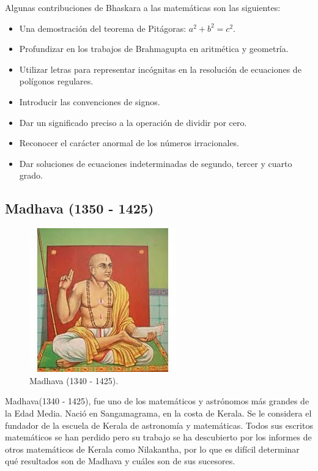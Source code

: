 \documentclass[a4paper, 11pt]{article}
\begin{document}
		Algunas contribuciones de Bhaskara a las matemáticas son las siguientes:
		\begin{itemize}
			\item Una demostración del teorema de Pitágoras: $a^{2}+b^{2}=c^{2}$.
			\item Profundizar en los trabajos de Brahmagupta en aritmética y geometría.
			\item Utilizar letras para representar incógnitas en la resolución de ecuaciones de polígonos regulares.
			\item Introducir las convenciones de signos.
			\item Dar un significado preciso a la operación de dividir por cero.
			\item Reconocer el carácter anormal de los números irracionales.
			\item Dar soluciones de ecuaciones indeterminadas de segundo, tercer y cuarto grado.
		\end{itemize}
		
	\subsection{Madhava (1350 - 1425)}
		\begin{figure}[!ht]
			\centering
			\includegraphics[width = 7 cm]{madhava.jpg}
			\caption{Madhava (1340 - 1425).}
			\label{fig:madhava}
		\end{figure}

		Madhava(1340 - 1425), fue uno de los matemáticos y astrónomos más grandes de la Edad Media. Nació en Sangamagrama,
		en la costa de Kerala. Se le considera el fundador de la escuela de Kerala de astronomía y matemáticas. Todos
		sus escritos matemáticos se han perdido pero su trabajo se ha descubierto por los informes de otros matemáticos
		de Kerala como Nilakantha, por lo que es difícil determinar qué resultados son de Madhava y cuáles son de sus
		sucesores.
		
\end{document}
